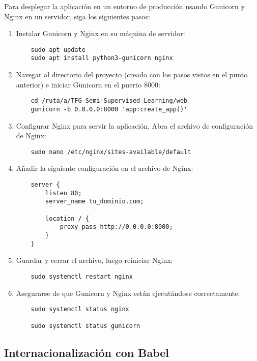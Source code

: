 Para desplegar la aplicación en un entorno de producción usando Gunicorn y Nginx en un servidor, siga los siguientes pasos:

\begin{enumerate}
    \item Instalar Gunicorn y Nginx en su máquina de servidor:
    \begin{verbatim}
    sudo apt update
    sudo apt install python3-gunicorn nginx
    \end{verbatim}

    \item Navegar al directorio del proyecto (creado con los pasos vistos en el punto anterior) e iniciar Gunicorn en el puerto 8000:
    \begin{verbatim}
    cd /ruta/a/TFG-Semi-Supervised-Learning/web
    gunicorn -b 0.0.0.0:8000 'app:create_app()'
    \end{verbatim}

    \item Configurar Nginx para servir la aplicación. Abra el archivo de configuración de Nginx:
    \begin{verbatim}
    sudo nano /etc/nginx/sites-available/default
    \end{verbatim}

    \item Añadir la siguiente configuración en el archivo de Nginx:
    \begin{verbatim}
    server {
        listen 80;
        server_name tu_dominio.com;

        location / {
            proxy_pass http://0.0.0.0:8000;
        }
    }
    \end{verbatim}

    \item Guardar y cerrar el archivo, luego reiniciar Nginx:
    \begin{verbatim}
    sudo systemctl restart nginx
    \end{verbatim}

    \item Asegurarse de que Gunicorn y Nginx están ejecutándose correctamente:
    \begin{verbatim}
    sudo systemctl status nginx

    sudo systemctl status gunicorn
    \end{verbatim}
\end{enumerate}

\subsection{Internacionalización con Babel}

